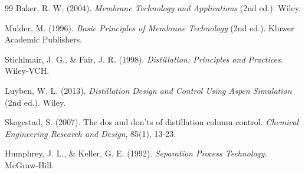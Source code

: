 \documentclass[11pt,a4paper]{article}
\begin{document}
\begin{thebibliography}{99}
Baker, R. W. (2004). \textit{Membrane Technology and Applications} (2nd ed.). Wiley.

Mulder, M. (1996). \textit{Basic Principles of Membrane Technology} (2nd ed.). Kluwer Academic Publishers.

Stichlmair, J. G., \& Fair, J. R. (1998). \textit{Distillation: Principles and Practices}. Wiley-VCH.

Luyben, W. L. (2013). \textit{Distillation Design and Control Using Aspen Simulation} (2nd ed.). Wiley.

Skogestad, S. (2007). The dos and don'ts of distillation column control. \textit{Chemical Engineering Research and Design}, 85(1), 13-23.

Humphrey, J. L., \& Keller, G. E. (1992). \textit{Separation Process Technology}. McGraw-Hill.

\end{thebibliography}
\end{document}
